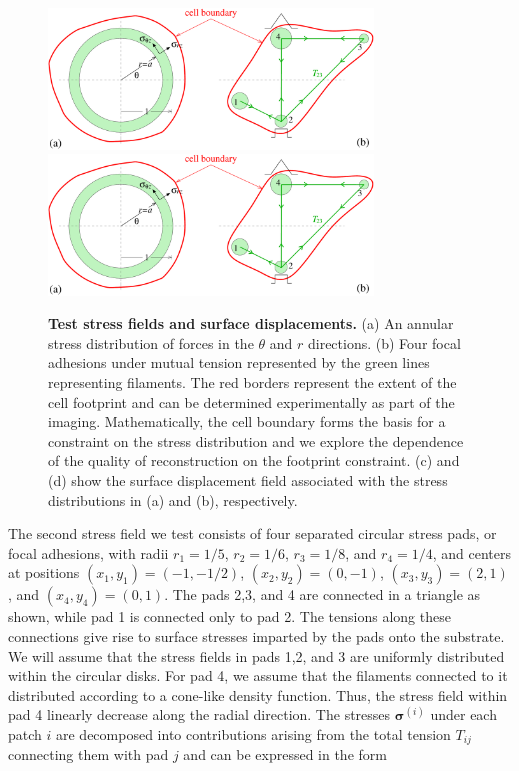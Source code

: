 \documentclass[aps,prl,reprint,twocolumn,groupedaddress,showpacs]{revtex4-1}
\newcommand{\bsigma}{{\boldsymbol\sigma}}
\begin{document}
\begin{figure}[h!]
\begin{center}
%
\includegraphics[width=3.4in]{tests.pdf}
\includegraphics[width=3.4in]{tests.pdf}
\caption{\textbf{Test stress fields and surface displacements.} (a) An
  annular stress distribution of forces in the $\theta$ and $r$
  directions. (b) Four focal adhesions under mutual tension
  represented by the green lines representing filaments. The red
  borders represent the extent of the cell footprint and can be
  determined experimentally as part of the imaging.  Mathematically,
  the cell boundary forms the basis for a constraint on the stress
  distribution and we explore the dependence of the quality of
  reconstruction on the footprint constraint. (c) and (d) show the
  surface displacement field associated with the stress distributions
  in (a) and (b), respectively.}
\label{TESTS}
\end{center}
\end{figure}
%

The second stress field we test consists of four separated circular
stress pads, or focal adhesions, with radii $r_{1} = 1/5$, $r_{2} =
1/6$, $r_{3} = 1/8$, and $r_{4} = 1/4$, and centers at positions
$(x_{1},y_{1}) = (-1,-1/2)$, $(x_{2},y_{2}) = (0,-1)$, $(x_{3},y_{3}) =
(2,1)$, and $(x_{4},y_{4}) = (0,1)$.  The pads 2,3, and 4 are
connected in a triangle as shown, while pad 1 is connected only to pad
2.  The tensions along these connections give rise to surface stresses
imparted by the pads onto the substrate.  We will assume that the
stress fields in pads 1,2, and 3 are uniformly distributed within the
circular disks. For pad 4, we assume that the filaments connected to
it distributed according to a cone-like density function. Thus, the
stress field within pad 4 linearly decrease along the radial
direction. The stresses $\bsigma^{(i)}$ under each patch $i$ are
decomposed into contributions arising from the total tension $T_{ij}$
connecting them with pad $j$ and can be expressed in the form
\end{document}
